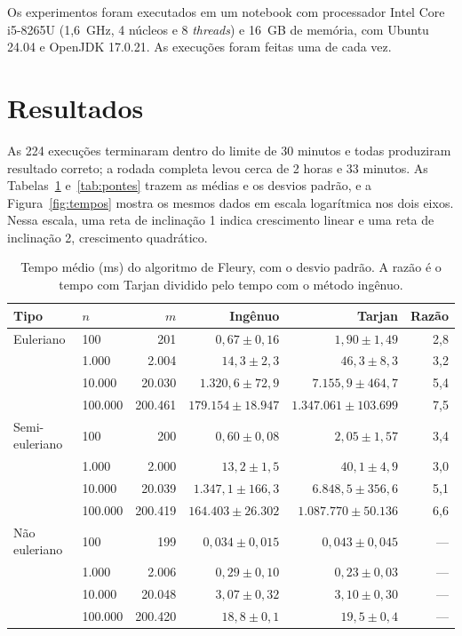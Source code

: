 Os experimentos foram executados em um notebook com processador Intel Core i5-8265U (1,6~GHz, 4 núcleos e 8 \emph{threads}) e 16~GB de memória, com Ubuntu 24.04 e OpenJDK 17.0.21. As execuções foram feitas uma de cada vez.

\section{Resultados}

As 224 execuções terminaram dentro do limite de 30 minutos e todas produziram resultado correto; a rodada completa levou cerca de 2 horas e 33 minutos. As Tabelas~\ref{tab:fleury} e~\ref{tab:pontes} trazem as médias e os desvios padrão, e a Figura~\ref{fig:tempos} mostra os mesmos dados em escala logarítmica nos dois eixos. Nessa escala, uma reta de inclinação 1 indica crescimento linear e uma reta de inclinação 2, crescimento quadrático.

\begin{table}[H]
  \centering
  \caption{Tempo médio (ms) do algoritmo de Fleury, com o desvio padrão. A razão é o tempo com Tarjan dividido pelo tempo com o método ingênuo.}
  \label{tab:fleury}
  \begin{tabular}{llrrrr}
    \toprule
    Tipo & $n$ & $m$ & Ingênuo & Tarjan & Razão \\
    \midrule
    Euleriano      & 100     & 201     & $0{,}67 \pm 0{,}16$        & $1{,}90 \pm 1{,}49$       & 2,8 \\
                   & 1.000   & 2.004   & $14{,}3 \pm 2{,}3$         & $46{,}3 \pm 8{,}3$        & 3,2 \\
                   & 10.000  & 20.030  & $1.320{,}6 \pm 72{,}9$     & $7.155{,}9 \pm 464{,}7$   & 5,4 \\
                   & 100.000 & 200.461 & $179.154 \pm 18.947$       & $1.347.061 \pm 103.699$   & 7,5 \\
    \midrule
    Semi-euleriano & 100     & 200     & $0{,}60 \pm 0{,}08$        & $2{,}05 \pm 1{,}57$       & 3,4 \\
                   & 1.000   & 2.000   & $13{,}2 \pm 1{,}5$         & $40{,}1 \pm 4{,}9$        & 3,0 \\
                   & 10.000  & 20.039  & $1.347{,}1 \pm 166{,}3$    & $6.848{,}5 \pm 356{,}6$   & 5,1 \\
                   & 100.000 & 200.419 & $164.403 \pm 26.302$       & $1.087.770 \pm 50.136$    & 6,6 \\
    \midrule
    Não euleriano  & 100     & 199     & $0{,}034 \pm 0{,}015$      & $0{,}043 \pm 0{,}045$     & --- \\
                   & 1.000   & 2.006   & $0{,}29 \pm 0{,}10$        & $0{,}23 \pm 0{,}03$       & --- \\
                   & 10.000  & 20.048  & $3{,}07 \pm 0{,}32$        & $3{,}10 \pm 0{,}30$       & --- \\
                   & 100.000 & 200.420 & $18{,}8 \pm 0{,}1$         & $19{,}5 \pm 0{,}4$        & --- \\
    \bottomrule
  \end{tabular}
\end{table}

